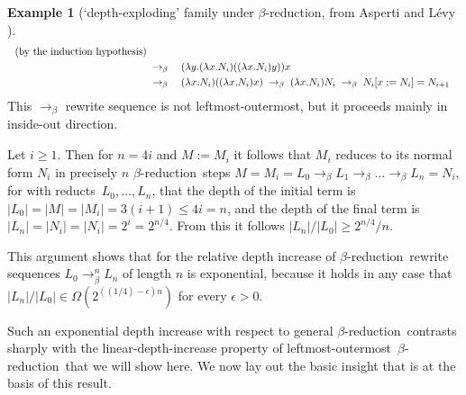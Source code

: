 \documentclass[
submission
]{dmtcs-episciences-tampered}
\newcommand{\fap}[2]{#1({#2})}
\newcommand{\indap}[2]{#1 _{#2}}
\newcommand{\bpap}[3]{#1 _{#2}^{#3}}
\newcommand{\nb}{\nobreakdash}
\newcommand{\nf}{\normalfont}
\newcommand{\sdefdby}{{:=}}
\newcommand{\defdby}{\mathrel{\sdefdby}}
\newcommand{\sbigOmega}{\Omega}
\newcommand{\bigOmega}{\fap{\sbigOmega}}
\newcommand{\avar}{x}
\newcommand{\bvar}{y}
\newcommand{\sdepth}{\text{\nf d}}
\newcommand{\depth}[1]{\lvert{#1}\rvert} \newcommand{\depthbig}[1]{\big\lvert{#1}\big\rvert} \newcommand{\sudepth}{\indap{\sdepth}{\text{\nf u}}}
\newcommand{\alter}{M}
\newcommand{\blter}{N}
\newcommand{\clter}{L}
\newcommand{\alteri}{\indap{\alter}}
\newcommand{\blteri}{\indap{\blter}}
\newcommand{\clteri}{\indap{\clter}}
\newcommand{\sslabs}{\lambda}
\newcommand{\slabs}[1]{\sslabs{#1}.}
\newcommand{\labs}[2]{\slabs{#1}{#2}}
\newcommand{\lapp}[2]{{#1}{#2}}
\newcommand{\substin}[2]{{#1}[{#2}]}
\newcommand{\substinfor}[3]{\substin{#1}{{#2}\defdby{#3}}}
\newcommand{\sred}{\to}
\newcommand{\sredin}[2]{\bpap{\sred}{#1}{#2}}
\newcommand{\sbetared}{\sred_{\beta}}
\newcommand{\betared}{\mathrel{\sbetared}}
\newcommand{\sbetaredn}{\sredin{\beta}}
\newcommand{\betaredn}[1]{\mathrel{\sbetaredn{#1}}}
\newcommand{\betareduction}{$\beta$\nb-re\-duc\-tion}
\newcommand{\lo}{left\-most-outer\-most}
\theoremstyle{plain}
\theoremstyle{definition}
\newtheorem{example}[theorem]{Example}
\begin{document}
\begin{example}[`depth-exploding' family under \betareduction, from Asperti and L\'{e}vy \cite{aspe:levy:2013}]
\begin{alignat*}{6}
      \hspace*{1.5ex}
    \text{(by the induction hypothesis)}    
    \\
      & \;\betared\; & & 
    \lapp{({\labs{\bvar}{\lapp{(\labs{\avar}{\blteri{i}})}{(\lapp{(\labs{\avar}{\blteri{i}})}{\bvar})}}})}{\avar}      
    \\
      & \;\betared\; & &
    \lapp{(\labs{\avar}{\blteri{i}})}{(\lapp{(\labs{\avar}{\blteri{i}})}{\avar})}   
\;\betared\;
    \lapp{(\labs{\avar}{\blteri{i}})}{\blteri{i}} 
\;\betared\; 
    \substinfor{\blteri{i}}{\avar}{\blteri{i}}
      =
    \blteri{i+1} 
  \end{alignat*}
  This $\sbetared$ rewrite sequence is not \lo, but it proceeds mainly in inside-out direction. 
  
  Let $i \ge 1$. Then for $n = 4i$ and $\alter \defdby \alteri{i}$
  it follows that $\alteri{i}$ reduces to its normal form $\blteri{i}$ in precisely $n$ \betareduction\ steps
  $\alter = \alteri{i} = \clteri{0} \betared \clteri{1} \betared \ldots \betared \clteri{n} = \blteri{i}$,
  for with reducts~$\clteri{0},\ldots,\clteri{n}$,
  that the depth of the initial term is
  $\depth{\clteri{0}} = \depth{\alter} = \depth{\alteri{i}} = 3 (i+1) \le 4i = n$,
  and the depth of the final term is
  $\depth{\clteri{n}} = \depth{\blteri{i}} = \depth{\blteri{i}} = 2^i = 2^{n/4}$.
  From this it follows
  $\depth{\clteri{n}}/\depth{\clteri{0}} \ge 2^{n/4}/n$. 
  
  This argument shows that for the relative depth increase of \betareduction\ rewrite sequences $\clteri{0} \betaredn{n} \clteri{n}$ of length $n$
  is exponential, because it holds in any case that
  $\depth{\clteri{n}}/\depth{\clteri{0}} \in \bigOmega{2^{((1/4)-\epsilon)n}}$ for every $\epsilon>0$.
\end{example}


\smallskip
Such an exponential depth increase with respect to general \betareduction\
contrasts sharply with the linear-depth-increase property of \lo\ \betareduction\ that we will show here.
We now lay out the basic insight that is at the basis of this result.
\end{document}
